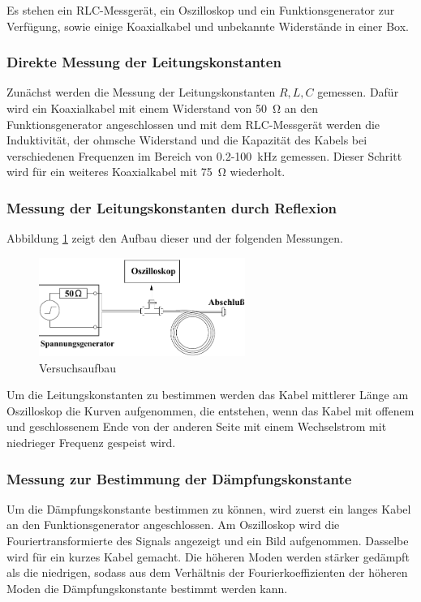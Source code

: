 Es stehen ein RLC-Messgerät, ein Oszilloskop und ein Funktionsgenerator zur Verfügung, sowie einige Koaxialkabel und unbekannte Widerstände in einer Box.
\subsubsection*{Direkte Messung der Leitungskonstanten}
Zunächst werden die Messung der Leitungskonstanten $R,L,C$ gemessen. Dafür wird ein Koaxialkabel mit einem Widerstand von \SI{50}{\ohm} an den Funktionsgenerator angeschlossen und mit dem RLC-Messgerät werden die Induktivität, der ohmsche Widerstand und die Kapazität des Kabels bei verschiedenen Frequenzen im Bereich von 0.2-\SI{100}{\kilo\hertz} gemessen. Dieser Schritt wird für ein weiteres Koaxialkabel mit \SI{75}{\ohm} wiederholt.
\subsubsection*{Messung der Leitungskonstanten durch Reflexion}
Abbildung \ref{fig:Aufbau} zeigt den Aufbau dieser und der folgenden Messungen. \\
\begin{figure}[h]
	\centering
	\includegraphics[width=0.6\textwidth]{Aufbau.pdf}
	\caption{Versuchsaufbau \cite{E2}}
	\label{fig:Aufbau}
\end{figure}
Um die Leitungskonstanten zu bestimmen werden das Kabel mittlerer Länge am Oszilloskop die Kurven aufgenommen, die entstehen, wenn das Kabel mit offenem und geschlossenem Ende von der anderen Seite mit einem Wechselstrom mit niedrieger Frequenz gespeist wird.

\subsubsection*{Messung zur Bestimmung der Dämpfungskonstante}
Um die Dämpfungskonstante bestimmen zu können, wird zuerst ein langes Kabel an den Funktionsgenerator angeschlossen. Am Oszilloskop wird die Fouriertransformierte des Signals angezeigt und ein Bild aufgenommen. Dasselbe wird für ein kurzes Kabel gemacht. Die höheren Moden werden stärker gedämpft als die niedrigen, sodass aus dem Verhältnis der Fourierkoeffizienten der höheren Moden die Dämpfungskonstante bestimmt werden kann.
